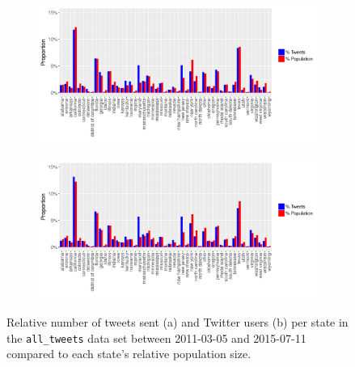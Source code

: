 \documentclass[11pt, a4paper,twoside]{report}\usepackage[]{graphicx}\usepackage[]{color}
\begin{document}
\begin{figure}[htbp!]
\centering
\begin{subfigure}[t]{1\textwidth}
  \includegraphics[width=1\linewidth]{14_activity_total_state_Twitter_full_aggregated.pdf}
  \caption{}
  \label{fig:tweets_state_full}
  \end{subfigure}
  
  \begin{subfigure}[t]{1\textwidth}
  \includegraphics[width=1\linewidth]{15_activity_total_user_state_Twitter_full_aggregated.pdf}
  \caption{}
    \label{fig:tweets_state_full_user}
  \end{subfigure}
\caption{Relative number of tweets sent (a) and Twitter users (b) per state in the \texttt{all\_tweets} data set between 2011-03-05 and 2015-07-11 compared to each state's relative population size.}
\label{fig:tweets_state}
\end{figure}
\end{document}
